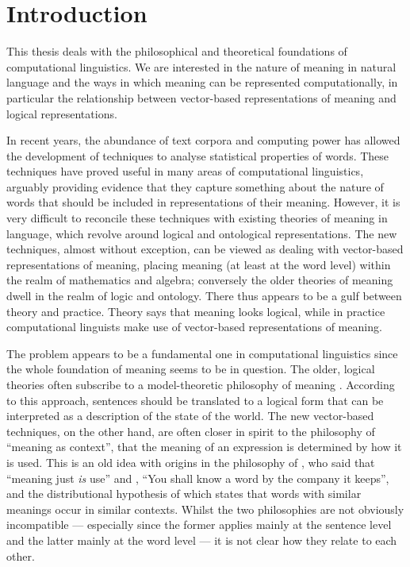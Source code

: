 \documentclass[12pt]{report}
\begin{document}
\chapter{Introduction}

This thesis deals with the philosophical and theoretical foundations of computational linguistics. We are interested in the nature of meaning in natural language and the ways in which meaning can be represented computationally, in particular the relationship between vector-based representations of meaning and logical representations.

In recent years, the abundance of text corpora and computing power has allowed the development of techniques to analyse statistical properties of words. These techniques have proved useful in many areas of computational linguistics, arguably providing evidence that they capture something about the nature of words that should be included in representations of their meaning. However, it is very difficult to reconcile these techniques with existing theories of meaning in language, which revolve around logical and ontological representations. The new techniques, almost without exception, can be viewed as dealing with vector-based representations of meaning, placing meaning (at least at the word level) within the realm of mathematics and algebra; conversely the older theories of meaning dwell in the realm of logic and ontology. There thus appears to be a gulf between theory and practice. Theory says that meaning looks logical, while in practice computational linguists make use of vector-based representations of meaning.

The problem appears to be a fundamental one in computational linguistics since the whole foundation of meaning seems to be in question. The older, logical theories often subscribe to a model-theoretic philosophy of meaning \citep{Kamp:93, Blackburn:05}. According to this approach, sentences should be translated to a logical form that can be interpreted as a description of the state of the world. The new vector-based techniques, on the other hand, are often closer in spirit to the philosophy of ``meaning as context'', that the meaning of an expression is determined by how it is used. This is an old idea with origins in the philosophy of \cite{Wittgenstein:53}, who said that ``meaning just \emph{is} use'' and \cite{Firth:57}, ``You shall know a word by the company it keeps'', and the distributional hypothesis of \cite{Harris:68} which states that words with similar meanings occur in similar contexts. Whilst the two philosophies are not obviously incompatible --- especially since the former applies mainly at the sentence level and the latter mainly at the word level --- it is not clear how they relate to each other.
\end{document}

